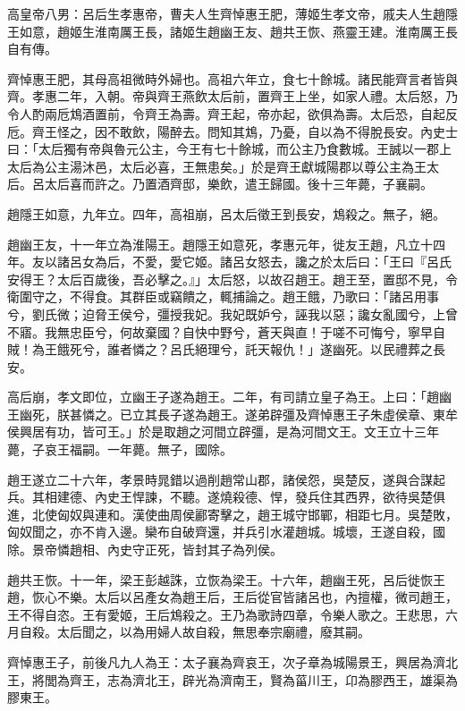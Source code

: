 
\begin{pinyinscope}
高皇帝八男：呂后生孝惠帝，曹夫人生齊悼惠王肥，薄姬生孝文帝，戚夫人生趙隱王如意，趙姬生淮南厲王長，諸姬生趙幽王友、趙共王恢、燕靈王建。淮南厲王長自有傳。

齊悼惠王肥，其母高祖微時外婦也。高祖六年立，食七十餘城。諸民能齊言者皆與齊。孝惠二年，入朝。帝與齊王燕飲太后前，置齊王上坐，如家人禮。太后怒，乃令人酌兩卮鴆酒置前，令齊王為壽。齊王起，帝亦起，欲俱為壽。太后恐，自起反卮。齊王怪之，因不敢飲，陽醉去。問知其鴆，乃憂，自以為不得脫長安。內史士曰：「太后獨有帝與魯元公主，今王有七十餘城，而公主乃食數城。王誠以一郡上太后為公主湯沐邑，太后必喜，王無患矣。」於是齊王獻城陽郡以尊公主為王太后。呂太后喜而許之。乃置酒齊邸，樂飲，遣王歸國。後十三年薨，子襄嗣。

趙隱王如意，九年立。四年，高祖崩，呂太后徵王到長安，鴆殺之。無子，絕。

趙幽王友，十一年立為淮陽王。趙隱王如意死，孝惠元年，徙友王趙，凡立十四年。友以諸呂女為后，不愛，愛它姬。諸呂女怒去，讒之於太后曰：「王曰『呂氏安得王？太后百歲後，吾必擊之。』」太后怒，以故召趙王。趙王至，置邸不見，令衛圍守之，不得食。其群臣或竊饋之，輒捕論之。趙王餓，乃歌曰：「諸呂用事兮，劉氏微；迫脅王侯兮，彊授我妃。我妃既妒兮，誣我以惡；讒女亂國兮，上曾不寤。我無忠臣兮，何故棄國？自快中野兮，蒼天與直！于嗟不可悔兮，寧早自賊！為王餓死兮，誰者憐之？呂氏絕理兮，託天報仇！」遂幽死。以民禮葬之長安。

高后崩，孝文即位，立幽王子遂為趙王。二年，有司請立皇子為王。上曰：「趙幽王幽死，朕甚憐之。已立其長子遂為趙王。遂弟辟彊及齊悼惠王子朱虛侯章、東牟侯興居有功，皆可王。」於是取趙之河間立辟彊，是為河間文王。文王立十三年薨，子哀王福嗣。一年薨。無子，國除。

趙王遂立二十六年，孝景時晁錯以過削趙常山郡，諸侯怨，吳楚反，遂與合謀起兵。其相建德、內史王悍諫，不聽。遂燒殺德、悍，發兵住其西界，欲待吳楚俱進，北使匈奴與連和。漢使曲周侯酈寄擊之，趙王城守邯鄲，相距七月。吳楚敗，匈奴聞之，亦不肯入邊。欒布自破齊還，并兵引水灌趙城。城壞，王遂自殺，國除。景帝憐趙相、內史守正死，皆封其子為列侯。

趙共王恢。十一年，梁王彭越誅，立恢為梁王。十六年，趙幽王死，呂后徙恢王趙，恢心不樂。太后以呂產女為趙王后，王后從官皆諸呂也，內擅權，微司趙王，王不得自恣。王有愛姬，王后鴆殺之。王乃為歌詩四章，令樂人歌之。王悲思，六月自殺。太后聞之，以為用婦人故自殺，無思奉宗廟禮，廢其嗣。

齊悼惠王子，前後凡九人為王：太子襄為齊哀王，次子章為城陽景王，興居為濟北王，將閭為齊王，志為濟北王，辟光為濟南王，賢為菑川王，卬為膠西王，雄渠為膠東王。


\end{pinyinscope}
